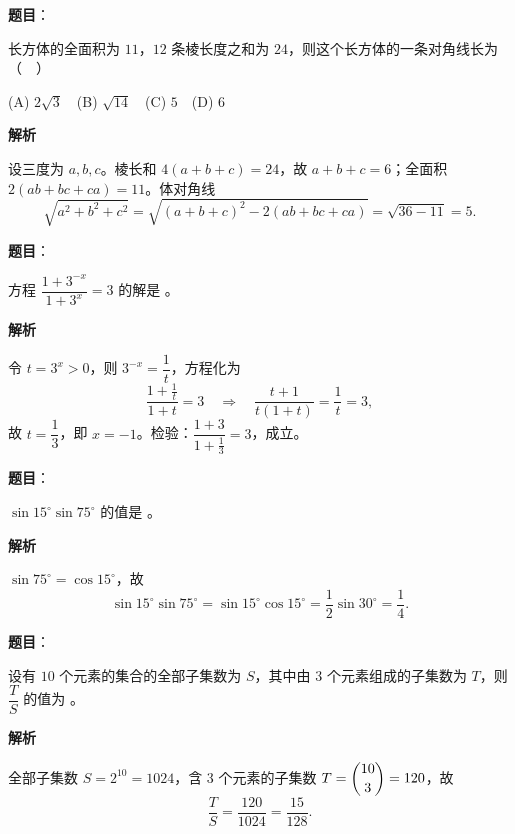 \begin{answer}

\textbf{题目}：

长方体的全面积为 \(11\)，\(12\) 条棱长度之和为 \(24\)，则这个长方体的一条对角线长为（　）

(A) \(2\sqrt{3}\)　(B) \(\sqrt{14}\)　(C) \(5\)　(D) \(6\)

\textbf{解析}

设三度为 \(a,b,c\)。棱长和 \(4(a+b+c)=24\)，故 \(a+b+c=6\)；全面积 \(2(ab+bc+ca)=11\)。体对角线
\nopagebreak[4]
\[
\sqrt{a^2+b^2+c^2}
=\sqrt{(a+b+c)^2-2(ab+bc+ca)}
=\sqrt{36-11}=5.
\]


\end{answer}
\begin{answer}

\textbf{题目}：

方程 \(\dfrac{1+3^{-x}}{1+3^{x}}=3\) 的解是 \underline{\qquad}。

\textbf{解析}

令 \(t=3^x>0\)，则 \(3^{-x}=\dfrac1t\)，方程化为
\nopagebreak[4]
\[
\frac{1+\frac1t}{1+t}=3
\quad\Longrightarrow\quad
\frac{t+1}{t(1+t)}=\frac1t=3,
\]
故 \(t=\dfrac13\)，即 \(x=-1\)。检验：\(\dfrac{1+3}{1+\frac13}=3\)，成立。


\end{answer}
\begin{answer}

\textbf{题目}：

\(\sin 15^{\circ}\sin 75^{\circ}\) 的值是 \underline{\qquad}。

\textbf{解析}

\(\sin75^\circ=\cos15^\circ\)，故
\nopagebreak[4]
\[
\sin15^\circ\sin75^\circ=\sin15^\circ\cos15^\circ=\frac12\sin30^\circ=\frac14.
\]


\end{answer}
\begin{answer}

\textbf{题目}：

设有 \(10\) 个元素的集合的全部子集数为 \(S\)，其中由 \(3\) 个元素组成的子集数为 \(T\)，则 $\mbox{\(\dfrac{T}{S}\)}$ 的值为 \underline{\qquad}。

\textbf{解析}

全部子集数 \(S=2^{10}=1024\)，含 3 个元素的子集数 \(T=\dbinom{10}{3}=120\)，故
\nopagebreak[4]
\[
\frac{T}{S}=\frac{120}{1024}=\frac{15}{128}.
\]


\end{answer}
